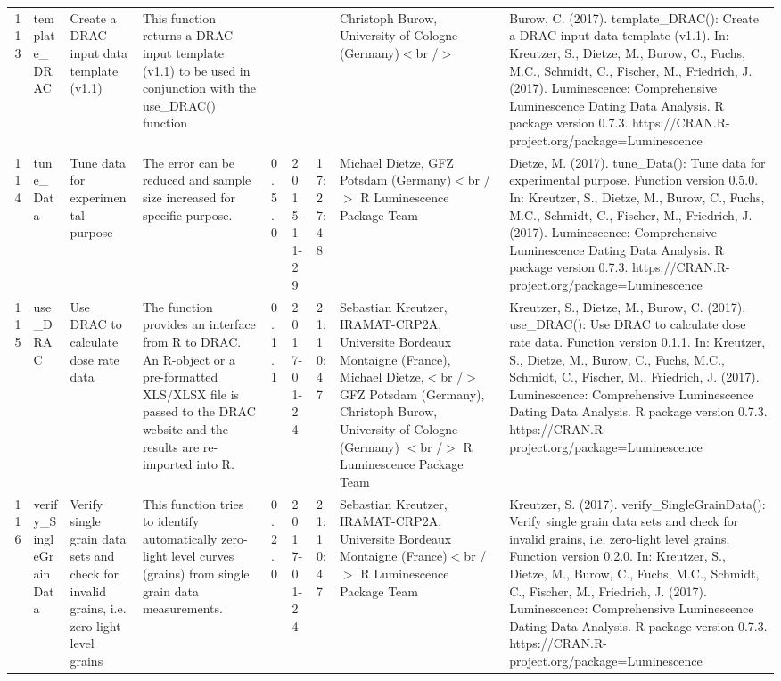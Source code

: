 \begin{table}[ht]
\begin{tabular}{rllllllll}
 \\ 
  113 & template\_DRAC & Create a DRAC input data template (v1.1) & This function returns a DRAC input template (v1.1) to be used in conjunction with the use\_DRAC() function &  &  &  & Christoph Burow, University of Cologne (Germany)$<$br /$>$ & Burow, C. (2017). template\_DRAC(): Create a DRAC input data template (v1.1). In: Kreutzer, S., Dietze, M., Burow, C., Fuchs, M.C., Schmidt, C., Fischer, M., Friedrich, J. (2017). Luminescence: Comprehensive Luminescence Dating Data Analysis. R package version 0.7.3. https://CRAN.R-project.org/package=Luminescence
 \\ 
  114 & tune\_Data & Tune data for experimental purpose & The error can be reduced and sample size increased for specific purpose. & 0.5.0 & 2015-11-29 & 17:27:48
 & Michael Dietze, GFZ Potsdam (Germany)$<$br /$>$  R Luminescence Package Team & Dietze, M. (2017). tune\_Data(): Tune data for experimental purpose. Function version 0.5.0. In: Kreutzer, S., Dietze, M., Burow, C., Fuchs, M.C., Schmidt, C., Fischer, M., Friedrich, J. (2017). Luminescence: Comprehensive Luminescence Dating Data Analysis. R package version 0.7.3. https://CRAN.R-project.org/package=Luminescence
 \\ 
  115 & use\_DRAC & Use DRAC to calculate dose rate data & The function provides an interface from R to DRAC. An R-object or a pre-formatted XLS/XLSX file is passed to the DRAC website and the results are re-imported into R. & 0.1.1 & 2017-01-24 & 21:10:47
 & Sebastian Kreutzer, IRAMAT-CRP2A, Universite Bordeaux Montaigne (France), Michael Dietze,$<$br /$>$ GFZ Potsdam (Germany), Christoph Burow, University of Cologne (Germany) $<$br /$>$  R Luminescence Package Team & Kreutzer, S., Dietze, M., Burow, C. (2017). use\_DRAC(): Use DRAC to calculate dose rate data. Function version 0.1.1. In: Kreutzer, S., Dietze, M., Burow, C., Fuchs, M.C., Schmidt, C., Fischer, M., Friedrich, J. (2017). Luminescence: Comprehensive Luminescence Dating Data Analysis. R package version 0.7.3. https://CRAN.R-project.org/package=Luminescence
 \\ 
  116 & verify\_SingleGrainData & Verify single grain data sets and check for invalid grains, i.e. zero-light level grains & This function tries to identify automatically zero-light level curves (grains) from single grain data measurements. & 0.2.0 & 2017-01-24 & 21:10:47
 & Sebastian Kreutzer, IRAMAT-CRP2A, Universite Bordeaux Montaigne (France)$<$br /$>$  R Luminescence Package Team & Kreutzer, S. (2017). verify\_SingleGrainData(): Verify single grain data sets and check for invalid grains, i.e. zero-light level grains. Function version 0.2.0. In: Kreutzer, S., Dietze, M., Burow, C., Fuchs, M.C., Schmidt, C., Fischer, M., Friedrich, J. (2017). Luminescence: Comprehensive Luminescence Dating Data Analysis. R package version 0.7.3. https://CRAN.R-project.org/package=Luminescence

\end{tabular}
\end{table}
